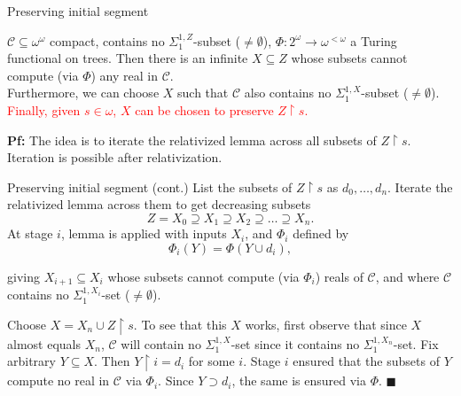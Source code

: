 \begin{frame}{Preserving initial segment}
  \begin{main-lemma*}
    $\mathcal{C}\subseteq\omega^\omega$ compact, contains no
    $\Sigma_1^{1,Z}$-subset ($\neq\emptyset$),
    $\Phi:2^{\omega}\rightarrow \omega^{<\omega}$ a Turing functional on
    trees. Then there is an infinite $X\subseteq Z$ whose subsets cannot
    compute (via $\Phi$) any real in $\mathcal{C}$.\\
    \vspace{0.5em}
    Furthermore, we can choose $X$ such that $\mathcal{C}$ also contains no
    $\Sigma_1^{1,X}$-subset ($\neq\emptyset$).\\
    \vspace{0.5em}
    \textcolor{red}{Finally, given $s\in\omega$, $X$ can be chosen to preserve
    $Z\restriction s$.}
  \end{main-lemma*}

  \vspace{1em}
  \textbf{Pf:} The idea is to iterate the relativized lemma across all
  subsets of $Z\restriction s$. Iteration is possible after relativization.
\end{frame}

\begin{frame}{Preserving initial segment (cont.)}
  List the subsets of $Z\restriction s$ as $d_0,\ldots,d_n$. Iterate the
  relativized lemma across them to get decreasing subsets
  \[Z=X_0 \supseteq X_1 \supseteq X_2 \supseteq\ldots \supseteq X_n.\]
  At stage $i$, lemma is applied with inputs $X_i$, and $\Phi_i$ defined
  by
  \[\Phi_i(Y) =\Phi(Y\cup d_i),\]

  giving $X_{i+1}\subseteq X_i$ whose subsets cannot compute (via
  $\Phi_i$) reals of $\mathcal{C}$, and where $\mathcal{C}$ contains no
  $\Sigma_1^{1,X_i}$-set ($\neq\emptyset$).

  \vspace{0.5em}
  Choose $X=X_n\cup Z\restriction s$. To see that this $X$ works, first
  observe that since $X$ almost equals $X_n$, $\mathcal{C}$ will
  contain no $\Sigma_1^{1,X}$-set since it contains no
  $\Sigma_1^{1,X_n}$-set. Fix arbitrary $Y\subseteq X$. Then
  $Y\restriction i=d_i$ for some $i$. Stage $i$ ensured that the subsets of
  $Y$ compute no real in $\mathcal{C}$ via $\Phi_i$. Since $Y\supset
  d_i$, the same is ensured via $\Phi$. $\blacksquare$
\end{frame}

